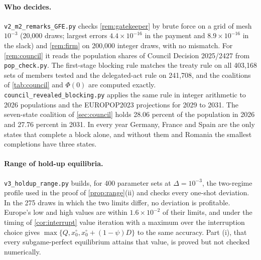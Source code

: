 \paragraph{Who decides.} \texttt{v2\_m2\_remarks\_GFE.py} checks \cref{rem:gatekeeper} by brute force on a grid of mesh $10^{-3}$ (20,000 draws; largest errors $4.4\times10^{-16}$ in the payment and $8.9\times10^{-16}$ in the slack) and \cref{rem:firm} on 200,000 integer draws, with no mismatch. For \cref{rem:council} it reads the population shares of Council Decision 2025/2427 \citep{council2025population} from \texttt{pop\_check.py}. The first-stage blocking rule matches the treaty rule on all 403,168 sets of members tested and the delegated-act rule on 241,708, and the coalitions of \cref{tab:council} and $\Phi(0)$ are computed exactly. \texttt{council\_revealed\_blocking.py} applies the same rule in integer arithmetic to 2026 populations and the EUROPOP2023 projections for 2029 to 2031. The seven-state coalition of \cref{sec:council} holds 28.06 percent of the population in 2026 and 27.76 percent in 2031. In every year Germany, France and Spain are the only states that complete a block alone, and without them and Romania the smallest completions have three states.

\paragraph{Range of hold-up equilibria.} \texttt{v3\_holdup\_range.py} builds, for 400 parameter sets at $\Delta=10^{-3}$, the two-regime profile used in the proof of \cref{prop:range}(ii) and checks every one-shot deviation. In the 275 draws in which the two limits differ, no deviation is profitable. Europe's low and high values are within $1.6\times10^{-2}$ of their limits, and under the timing of \cref{cor:interrupt} value iteration with a maximum over the interruption choice gives $\max\{Q,x^\circ_0,x^\circ_0+(1-\psi)D\}$ to the same accuracy. Part (i), that every subgame-perfect equilibrium attains that value, is proved but not checked numerically.

